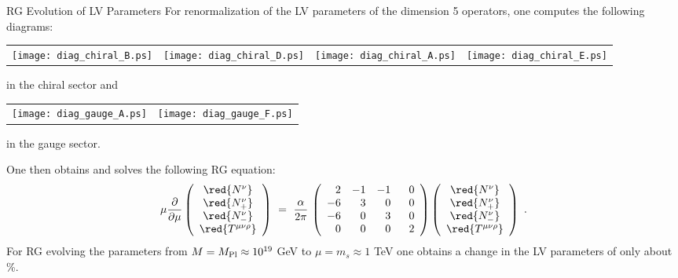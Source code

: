 \documentclass[pdf,PItalk,slideColor,colorBG,accumulate]{prosper}
\begin{document}
{
\begin{slide}[Replace]{RG Evolution of LV Parameters}
\vspace{-0.5cm}
	For renormalization of the LV parameters of the dimension 5
	operators, one computes the following diagrams:
\begin{center}
\begin{tabular}{cccc}
\texttt{[image: diag\_chiral\_B.ps]}
&
\texttt{[image: diag\_chiral\_D.ps]}
&
\texttt{[image: diag\_chiral\_A.ps]}
&
\texttt{[image: diag\_chiral\_E.ps]}
\end{tabular}
\end{center}
	in the chiral sector and
\begin{center}
\begin{tabular}{cc}
\texttt{[image: diag\_gauge\_A.ps]}
&
\texttt{[image: diag\_gauge\_F.ps]}
\end{tabular}
\end{center}
	in the gauge sector.

	One then obtains and solves the following RG equation:
\begin{equation*}
     \mu \frac{\partial}
              {\partial\mu} 
                \left(
\begin{array}{c}
               \red{N^\nu} \\ 
   \red{N_+^\nu} \\
                   \red{N_{-}^\nu} \\
   \red{T^{\mu\nu\rho}}
                \end{array} \right) ~=~  
     \frac{\alpha}
          {2 \pi} \, 
     \left(\begin{array}{rrrr}
                    2 & -1 & -1 & ~~0 \\
   -6 &  3 &  0 & ~~0 \\
                   -6 &  0 &  3 & ~~0 \\
    0 &  0 &  0 & ~~2
           \end{array}\right)
     \left(
  \begin{array}{c}
                 \red{N^\nu} \\ 
 \red{N_+^\nu} \\
                 \red{N_{-}^\nu} \\
 \red{T^{\mu\nu\rho}}
          \end{array} \right)~.
\end{equation*}
%
	For RG evolving the parameters from 
{\red $M = M_{\rm Pl} \approx 10^{19}$ GeV} to
{\red $\mu = m_{s} \approx 1$ TeV} one obtains a change in the 
LV parameters of only about {\%}.

\end{slide}
}
\end{document}
